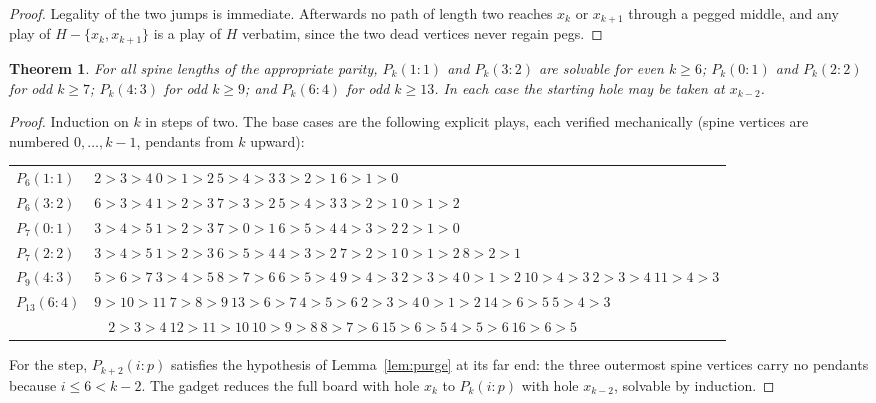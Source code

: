 \documentclass[11pt]{article}
\newtheorem{theorem}{Theorem}[section]
\theoremstyle{definition}
\begin{document}
\begin{proof}
Legality of the two jumps is immediate. Afterwards no path of length
two reaches $x_k$ or $x_{k+1}$ through a pegged middle, and any play
of $H-\{x_k,x_{k+1}\}$ is a play of $H$ verbatim, since the two dead
vertices never regain pegs.
\end{proof}

\begin{theorem}\label{thm:families}
For all spine lengths of the appropriate parity,
$P_k(1\!:\!1)$ and $P_k(3\!:\!2)$ are solvable for even $k\ge 6$;
$P_k(0\!:\!1)$ and $P_k(2\!:\!2)$ for odd $k\ge 7$;
$P_k(4\!:\!3)$ for odd $k\ge 9$; and $P_k(6\!:\!4)$ for odd
$k\ge 13$. In each case the starting hole may be taken at
$x_{k-2}$.
\end{theorem}

\begin{proof}
Induction on $k$ in steps of two. The base cases are the following
explicit plays, each verified mechanically (spine vertices are
numbered $0,\dots,k-1$, pendants from $k$ upward):
\begin{center}\footnotesize
\begin{tabular}{ll}
\toprule
$P_6(1\!:\!1)$ & $2{>}3{>}4\ 0{>}1{>}2\ 5{>}4{>}3\ 3{>}2{>}1\ 6{>}1{>}0$\\
$P_6(3\!:\!2)$ & $6{>}3{>}4\ 1{>}2{>}3\ 7{>}3{>}2\ 5{>}4{>}3\ 3{>}2{>}1\ 0{>}1{>}2$\\
$P_7(0\!:\!1)$ & $3{>}4{>}5\ 1{>}2{>}3\ 7{>}0{>}1\ 6{>}5{>}4\ 4{>}3{>}2\ 2{>}1{>}0$\\
$P_7(2\!:\!2)$ & $3{>}4{>}5\ 1{>}2{>}3\ 6{>}5{>}4\ 4{>}3{>}2\ 7{>}2{>}1\ 0{>}1{>}2\ 8{>}2{>}1$\\
$P_9(4\!:\!3)$ & $5{>}6{>}7\ 3{>}4{>}5\ 8{>}7{>}6\ 6{>}5{>}4\ 9{>}4{>}3\ 2{>}3{>}4\ 0{>}1{>}2\ 10{>}4{>}3\ 2{>}3{>}4\ 11{>}4{>}3$\\
$P_{13}(6\!:\!4)$ & $9{>}10{>}11\ 7{>}8{>}9\ 13{>}6{>}7\ 4{>}5{>}6\ 2{>}3{>}4\ 0{>}1{>}2\ 14{>}6{>}5\ 5{>}4{>}3$\\
& $\quad 2{>}3{>}4\ 12{>}11{>}10\ 10{>}9{>}8\ 8{>}7{>}6\ 15{>}6{>}5\ 4{>}5{>}6\ 16{>}6{>}5$\\
\bottomrule
\end{tabular}
\end{center}
For the step, $P_{k+2}(i\!:\!p)$ satisfies the hypothesis of
Lemma~\ref{lem:purge} at its far end: the three outermost spine
vertices carry no pendants because $i\le 6 < k-2$. The gadget reduces
the full board with hole $x_k$ to $P_k(i\!:\!p)$ with hole
$x_{k-2}$, solvable by induction.
\end{proof}
\end{document}
